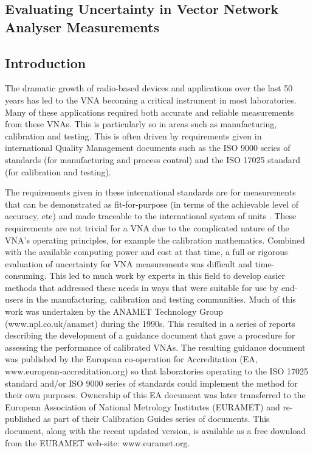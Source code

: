 \documentclass[../thesis/thesis.tex]{subfiles}
\begin{document}
	
\onlyinsubfile{\setcounter{chapter}{3}}

\begin{refsection}
\chapter[Evaluating Uncertainty in VNA Measurements]{Evaluating Uncertainty in Vector Network Analyser Measurements}
\section{Introduction}
The dramatic growth of radio-based devices and applications over the last 50 years has led to the VNA becoming a critical instrument in most laboratories. Many of these applications required both accurate and reliable measurements from these VNAs.  This is particularly so in areas such as manufacturing, calibration and testing.  This is often driven by requirements given in international Quality Management documents such as the ISO 9000 series of standards \cite{ISO9000} (for manufacturing and process control) and the ISO 17025 standard \cite{ISO17025} (for calibration and testing).

The requirements given in these international standards are for measurements that can be demonstrated as fit-for-purpose (in terms of the achievable level of accuracy, etc) and made traceable to the international system of units \cite{SI_2019, SI_2019B}.  These requirements are not trivial for a VNA due to the complicated nature of the VNA’s operating principles, for example the calibration mathematics. Combined with the available computing power and cost at that time, a full or rigorous evaluation of uncertainty for VNA measurements was difficult and time-consuming. This led to much work by experts in this field to develop easier methods that addressed these needs in ways that were suitable for use by end-users in the manufacturing, calibration and testing communities.  Much of this work was undertaken by the ANAMET Technology Group (www.npl.co.uk/anamet) during the 1990s.  This resulted in a series of reports \cite{ANAMET_1996, ANAMET_1998, ANAMET_1999} describing the development of a guidance document that gave a procedure for assessing the performance of calibrated VNAs.  The resulting guidance document \cite{EA_2000} was published by the European co-operation for Accreditation (EA, www.european-accreditation.org) so that laboratories operating to the ISO 17025 standard and/or ISO 9000 series of standards could implement the method for their own purposes.  Ownership of this EA document was later transferred to the European Association of National Metrology Institutes (EURAMET) and re-published \cite{EURAMET_2011} as part of their Calibration Guides series of documents. This document, along with the recent updated version, is available as a free download from the EURAMET web-site: www.euramet.org.


\end{refsection}
\end{document}
